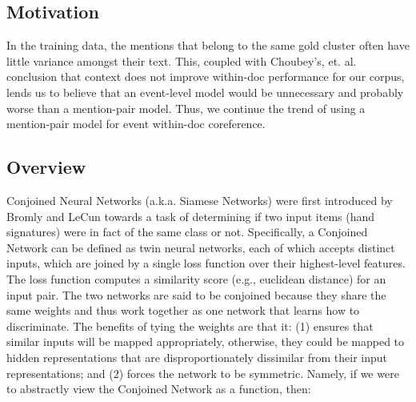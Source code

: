 \documentclass[11pt,a4paper]{article}
\begin{document}
\subsection{Motivation}
In the training data, the mentions that belong to the same gold cluster often have little variance amongst their text.  This, coupled with Choubey's, et. al.  conclusion that context does not improve within-doc performance for our corpus, lends us to believe that an event-level model would be unnecessary and probably worse than a mention-pair model.  Thus, we continue the trend of using a mention-pair model for event within-doc coreference.

\subsection{Overview}
Conjoined Neural Networks (a.k.a. Siamese Networks) were first introduced by Bromly and LeCun  towards a task of determining if two input items (hand signatures) were in fact of the same class or not.  Specifically, a Conjoined Network can be defined as twin neural networks, each of which accepts distinct inputs, which are joined by a single loss function over their highest-level features.  The loss function computes a similarity score (e.g., euclidean distance) for an input pair.  The two networks are said to be conjoined because they share the same weights and thus work together as one network that learns how to discriminate.  The benefits of tying the weights are that it: (1) ensures that similar inputs will be mapped appropriately, otherwise, they could be mapped to hidden representations that are disproportionately dissimilar from their input representations; and (2) forces the network to be symmetric.  Namely, if we were to abstractly view the Conjoined Network as a function, then:
\end{document}
